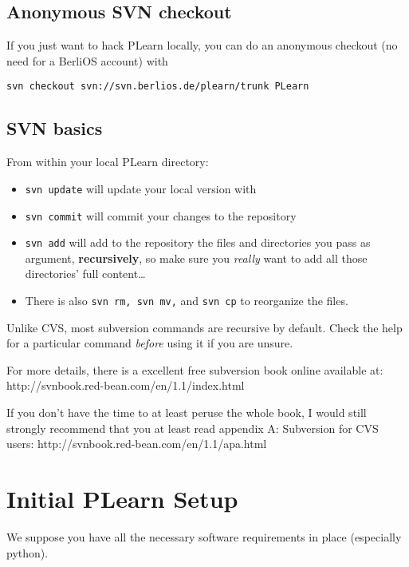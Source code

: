 \documentclass[11pt]{book}
\begin{document}
\subsection{Anonymous SVN checkout}

If you just want to hack PLearn locally, you can do an anonymous checkout (no need for a BerliOS account) with
\begin{verbatim}
svn checkout svn://svn.berlios.de/plearn/trunk PLearn
\end{verbatim}



\subsection{SVN basics}

From within your local PLearn directory:
\begin{itemize}
\item {\tt svn update} will update your local version with 
\item {\tt svn commit} will commit your changes to the repository
\item {\tt svn add} will add to the repository the files and directories
  you pass as argument, {\bf recursively}, so make sure you {\em really} want to
  add all those directories' full content\ldots
\item There is also {\tt svn rm, svn mv,} and {\tt svn cp} to reorganize the files.
\end{itemize}

Unlike CVS, most subversion commands are recursive by default. Check the
help for a particular command {\em before} using it if you are unsure.

For more details, there is a excellent free subversion book online available at:
http://svnbook.red-bean.com/en/1.1/index.html

If you don't have the time to at least peruse the whole book, I would still
strongly recommend that you at least read appendix A: Subversion for CVS
users: http://svnbook.red-bean.com/en/1.1/apa.html


\section{Initial PLearn Setup}

We suppose you have all the necessary software requirements in place (especially python).
\end{document}
